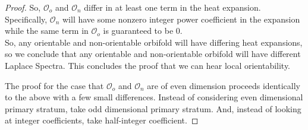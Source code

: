 \documentclass{amsart}
\theoremstyle{plain}
\theoremstyle{definition}
\theoremstyle{remark}
\newcommand{\orb}{\mathcal O}
\begin{document}
\begin{proof}
So, $\orb_o$ and $\orb_n$ differ in at least one term in the heat
expansion. Specifically, $\orb_n$ will have some nonzero integer power
coefficient in the expansion while the same term in $\orb_o$ is guaranteed
to be $0$.\\

So, any orientable and non-orientable orbifold will have differing heat
expansions, so we conclude that any orientable and non-orientable orbifold
will have different Laplace Spectra. This concludes the proof that we can
hear local orientability.

The proof for the case that $\orb_o$ and $\orb_n$ are of even dimension
proceeds identically to the above with a few small differences. Instead of
considering even dimensional primary stratum, take odd dimensional primary
stratum. And, instead of looking at integer coefficients, take half-integer
coefficient.

\end{proof}




\end{document}
